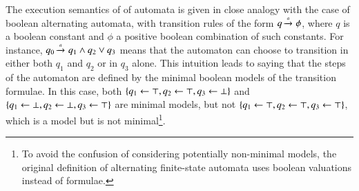 \documentclass{llncs}
\begin{document}
The execution semantics of of automata is given in close analogy with
the case of boolean alternating automata, with transition rules of the
form $q \xrightarrow{{\scriptscriptstyle a}}_{{\scriptstyle }} \phi$, where $q$ is a boolean constant and $\phi$
a positive boolean combination of such constants. For instance, $q_0
\xrightarrow{{\scriptscriptstyle a}}_{{\scriptstyle }} q_1 \wedge q_2 \vee q_3$ means that the automaton can
choose to transition in either both $q_1$ and $q_2$ or in $q_3$
alone. This intuition leads to saying that the steps of the automaton
are defined by the minimal boolean models of the transition
formulae. In this case, both $\{ q_1 \leftarrow \top, q_2 \leftarrow
  \top, q_3 \leftarrow \bot \}$ and $\{ q_1 \leftarrow \bot, q_2
  \leftarrow \bot, q_3 \leftarrow \top \}$ are minimal models, but not
$\{ q_1 \leftarrow \top, q_2 \leftarrow \top, q_3 \leftarrow \top \}$,
which is a model but is not minimal\footnote{To avoid the confusion of
  considering potentially non-minimal models, the original definition
  of alternating finite-state automata \cite{ChandraKozenStockmeyer81}
  uses boolean valuations instead of formulae.}.
\end{document}
